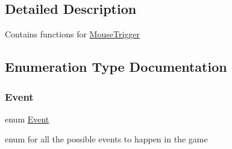 \subsection{Detailed Description}
Contains functions for \hyperlink{structMouseTrigger}{Mouse\+Trigger} 

\subsection{Enumeration Type Documentation}
\mbox{\label{group__MouseTrigger_ga5667b805d857c6d28f83f6038a0272d3}} 
\subsubsection{\texorpdfstring{Event}{Event}}
{\footnotesize\ttfamily enum \hyperlink{group__MouseTrigger_ga5667b805d857c6d28f83f6038a0272d3}{Event}}



enum for all the possible events to happen in the game 

